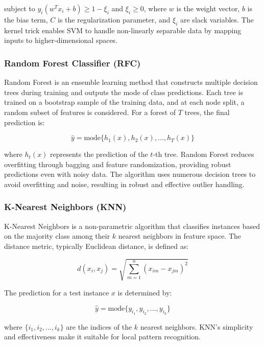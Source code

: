 \documentclass[final,5p, twocolumn]{elsarticle}
\begin{document}
subject to $y_i(w^T x_i + b) \geq 1 - \xi_i$ and $\xi_i \geq 0$, where $w$ is the weight vector, $b$ is the bias term, $C$ is the regularization parameter, and $\xi_i$ are slack variables. The kernel trick enables SVM to handle non-linearly separable data by mapping inputs to higher-dimensional spaces.

\subsubsection{Random Forest Classifier (RFC)}

Random Forest is an ensemble learning method that constructs multiple decision trees during training and outputs the mode of class predictions. Each tree is trained on a bootstrap sample of the training data, and at each node split, a random subset of features is considered. For a forest of $T$ trees, the final prediction is:

\begin{equation}
\hat{y} = \text{mode}\{h_1(x), h_2(x), ..., h_T(x)\}
\end{equation}

where $h_t(x)$ represents the prediction of the $t$-th tree. Random Forest reduces overfitting through bagging and feature randomization, providing robust predictions even with noisy data. The algorithm uses numerous decision trees to avoid overfitting and noise, resulting in robust and effective outlier handling.

\subsubsection{K-Nearest Neighbors (KNN)}

K-Nearest Neighbors is a non-parametric algorithm that classifies instances based on the majority class among their $k$ nearest neighbors in feature space. The distance metric, typically Euclidean distance, is defined as:

\begin{equation}
d(x_i, x_j) = \sqrt{\sum_{m=1}^{n}(x_{im} - x_{jm})^2}
\end{equation}

The prediction for a test instance $x$ is determined by:

\begin{equation}
\hat{y} = \text{mode}\{y_{i_1}, y_{i_2}, ..., y_{i_k}\}
\end{equation}

where $\{i_1, i_2, ..., i_k\}$ are the indices of the $k$ nearest neighbors. KNN's simplicity and effectiveness make it suitable for local pattern recognition.
\end{document}
